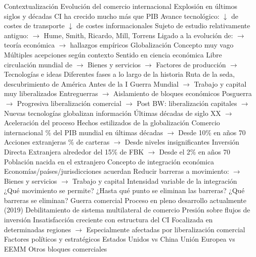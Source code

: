 \documentclass{nuevotema}
\begin{document}
\begin{esquemal}
	\1[] 
		\2 Contextualización
			\3 Evolución del comercio internacional
				\4 Explosión en últimos siglos y décadas
				\4[] CI ha crecido mucho más que PIB
				\4 Avance tecnológico:
				\4[] $\downarrow$ de costes de transporte
				\4[] $\downarrow$ de costes informacionales
				\4 Sujeto de estudio relativamente antiguo:
				\4[] $\to$ Hume, Smith, Ricardo, Mill, Torrens
				\4[] Ligado a la evolución de:
				\4[] $\to$ teoría económica
				\4[] $\to$ hallazgos empíricos
			\3 Globalización
				\4 Concepto muy vago
				\4[] Múltiples acepciones según contexto
				\4 Sentido en ciencia económica
				\4[] Libre circulación mundial de
				\4[] $\to$ Bienes y servicios
				\4[] $\to$ Factores de producción
				\4[] $\to$ Tecnologías e ideas
				\4 Diferentes fases a lo largo de la historia
				\4[] Ruta de la seda, descubrimiento de América
				\4[] Antes de la I Guerra Mundial
				\4[] $\to$ Trabajo y capital muy liberalizados
				\4[] Entreguerras
				\4[] $\to$ Aislamiento de bloques económicos
				\4[] Posguerra
				\4[] $\to$ Progresiva liberalización comercial
				\4[] $\to$ Post BW: liberalización capitales
				\4[] $\to$ Nuevas tecnologías globalizan información
				\4 Últimas décadas de siglo XX
				\4[] $\to$ Aceleración del proceso
				\4 Hechos estilizados de la globalización
				\4[] Comercio internacional
				\% del PIB mundial en últimas décadas
				\4[] $\to$ Desde 10\% en años 70
				\4 Acciones extranjeras
				\% de carteras
				\4[] $\to$ Desde niveles insignificantes
				\4 Inversión Directa Extranjera
				\4[] alrededor del 15\% de FBK
				\4[] $\to$ Desde el 2\% en años 70
				\4 Población nacida en el extranjero
			\3 Concepto de integración económica
				\4 Economías/países/jurisdicciones acuerdan
				\4[] Reducir barreras a movimiento:
				\4[] $\to$ Bienes y servicios
				\4[] $\to$ Trabajo y capital
				\4 Intensidad variable de la integración
				\4[] ¿Qué movimiento se permite?
				\4[] ¿Hasta qué punto se eliminan las barreras?
				\4[] ¿Qué barreras se eliminan?
			\3 Guerra comercial
				\4 Proceso en pleno desarrollo actualmente (2019)
				\4[] Debilitamiento de sistema multilateral de comercio
				\4[] Presión sobre flujos de inversión
				\4 Insatisfacción creciente con estructura del CI
				\4[] Focalizada en determinadas regiones
				\4[] $\to$ Especialmente afectadas por liberalización comercial
				\4 Factores políticos y estratégicos
				\4[] Estados Unidos vs China
				\4[] Unión Europea vs EEMM
				\4[] Otros bloques comerciales

\end{esquemal}
\end{document}
